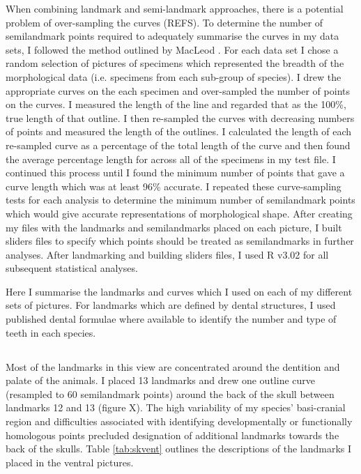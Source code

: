 When combining landmark and semi-landmark approaches, there is a potential problem of over-sampling the curves (REFS). To determine the number of semilandmark points required to adequately summarise the curves in my data sets,  I followed the method outlined by MacLeod \citeyearpar{MacLeod2012}. For each data set I chose a random selection of pictures of specimens which represented the breadth of the morphological data (i.e. specimens from each sub-group of species).  I drew the appropriate curves on the each specimen and over-sampled the number of points on the curves. I measured the length of the line and regarded that as the 100\%, true length of that outline. I then re-sampled the curves with decreasing numbers of points and measured the length of the outlines. I calculated the length of each re-sampled curve as a percentage of the total length of the curve and then found the average percentage length for across all of the specimens in my test file. I continued this process until I found the minimum number of points that gave a curve length which was at least 96\% accurate.  I repeated these curve-sampling tests for each analysis to determine the minimum number of semilandmark points which would give accurate representations of morphological shape.
After creating my files with the landmarks and semilandmarks placed on each picture, I built sliders files \citep{Zelditch2012} to specify which points should be treated as semilandmarks in further analyses. After landmarking and building sliders files, I used R v3.02 \citep[R Development Core][]{Team2013} for all subsequent statistical analyses.

Here I summarise the landmarks and curves which I used on each of my different sets of pictures. For landmarks which are defined by dental structures, I used published dental formulae \citep{Nowak1983, MacPhee1987, KnoxJones1992, Marshall1996, Nagorsen2002, Goodman2006, Asher2008, ADW2013} where available to identify the number and type of teeth in each species.

\subsection{}
Most of the landmarks in this view are concentrated around the dentition and palate of the animals. I placed 13 landmarks and drew one outline curve (resampled to 60 semilandmark points) around the back of the skull between landmarks 12 and 13 (figure X). The high variability of my species’ basi-cranial region and difficulties associated with identifying developmentally or functionally homologous points precluded designation of additional landmarks towards the back of the skulls. Table \ref{tab:skvent} outlines the descriptions of the landmarks I placed in the ventral pictures.

